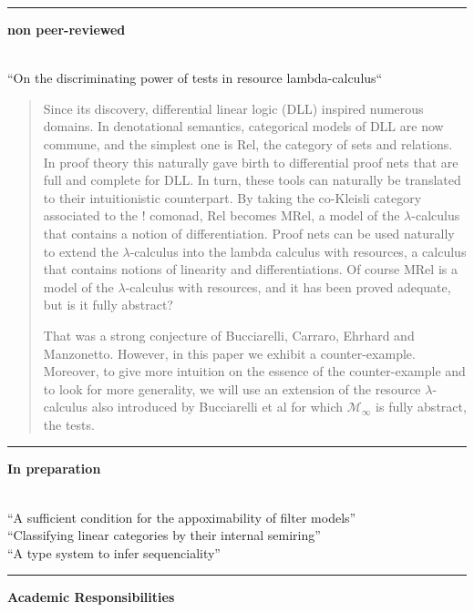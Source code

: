 \documentclass{article}[11pt]
\begin{document}
\noindent \rule{5.5em}{1pt} {\bf non peer-reviewed}  \nobreak
\begin{itemize}[itemindent=0em,leftmargin=6em, labelsep=1em]
\\ ``On the discriminating power of tests in resource lambda-calculus``\vspace{-0.5em}
\begin{quote}
  Since its discovery, differential linear logic (DLL) inspired numerous
  domains. In denotational semantics, categorical models of DLL are now
  commune, and the simplest one is Rel, the category of sets and relations.
  In proof theory this naturally gave birth to differential proof nets that are
  full and complete for DLL. In turn, these tools can naturally be translated
  to their intuitionistic counterpart. By taking the co-Kleisli category 
  associated to the ! comonad, Rel becomes MRel, a model of the $\lambda$-calculus that
  contains a notion of differentiation. Proof nets can be used naturally to
  extend the $\lambda$-calculus into the lambda calculus with resources, a calculus
  that contains notions of linearity and differentiations. Of course MRel is
  a model of the $\lambda$-calculus with resources, and it has been proved adequate,
  but is it fully abstract?
  
  That was a strong conjecture of Bucciarelli, Carraro, Ehrhard and
  Manzonetto. However, in this paper we exhibit a counter-example.
  Moreover, to give more intuition on the essence of the counter-example
  and to look for more generality, we will use an extension of the resource
  $\lambda$-calculus also introduced by Bucciarelli et al for which $\mathcal{M}_\infty$ is fully
  abstract, the tests.
\end{quote}
\end{itemize}
\noindent \rule{5.5em}{1pt} {\bf In preparation}  \nobreak
\begin{itemize}[itemindent=0em,leftmargin=6em, labelsep=1em]
\\ ``A sufficient condition for the appoximability of filter models''
\\ ``Classifying linear categories by their internal semiring''
\\ ``A type system to infer sequenciality''
\end{itemize}

\noindent \rule{5.5em}{7pt} {\large \bf Academic Responsibilities}  \nobreak
\begin{itemize}[itemindent=0em,leftmargin=6em, labelsep=1em]
\end{itemize}
\end{document}
